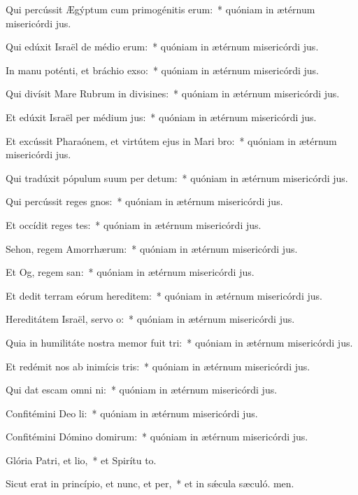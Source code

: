 \item Qui percússit Ægýptum cum primogénitis erum:~* quóniam in ætérnum misericórdi jus.
\item Qui edúxit Israël de médio erum:~* quóniam in ætérnum misericórdi jus.
\item In manu poténti, et bráchio exso:~* quóniam in ætérnum misericórdi jus.
\item Qui divísit Mare Rubrum in divisines:~* quóniam in ætérnum misericórdi jus.
\item Et edúxit Israël per médium jus:~* quóniam in ætérnum misericórdi jus.
\item Et excússit Pharaónem, et virtútem ejus in Mari bro:~* quóniam in ætérnum misericórdi jus.
\item Qui tradúxit pópulum suum per detum:~* quóniam in ætérnum misericórdi jus.
\item Qui percússit reges gnos:~* quóniam in ætérnum misericórdi jus.
\item Et occídit reges tes:~* quóniam in ætérnum misericórdi jus.
\item Sehon, regem Amorrhærum:~* quóniam in ætérnum misericórdi jus.
\item Et Og, regem san:~* quóniam in ætérnum misericórdi jus.
\item Et dedit terram eórum hereditem:~* quóniam in ætérnum misericórdi jus.
\item Hereditátem Israël, servo o:~* quóniam in ætérnum misericórdi jus.
\item Quia in humilitáte nostra memor fuit tri:~* quóniam in ætérnum misericórdi jus.
\item Et redémit nos ab inimícis tris:~* quóniam in ætérnum misericórdi jus.
\item Qui dat escam omni ni:~* quóniam in ætérnum misericórdi jus.
\item Confitémini Deo li:~* quóniam in ætérnum misericórdi jus.
\item Confitémini Dómino domirum:~* quóniam in ætérnum misericórdi jus.
\item Glória Patri, et lio,~* et Spirítu to.
\item Sicut erat in princípio, et nunc, et per,~* et in sǽcula sæculó. men.

